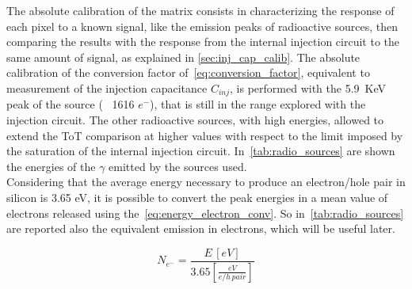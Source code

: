 The absolute calibration of the matrix consists in characterizing the response of each pixel to a known signal, like the emission peaks of radioactive sources, then comparing the results with the response from the internal injection circuit to the same amount of signal, as explained in \autoref{sec:inj_cap_calib}. 
The absolute calibration of the conversion factor of~\autoref{eq:conversion_factor}, equivalent to measurement of the injection capacitance $C_{inj}$,  is performed with the \SI{5.9}{KeV} peak of the  source (~ 1616 $e^{-}$), that is still in the range explored with the injection circuit. The other radioactive sources, with high energies, allowed to extend the ToT comparison at higher values with respect to the limit imposed by the saturation of the internal injection circuit. In~\autoref{tab:radio_sources} are shown the energies of the $\gamma$ emitted by the sources used.\\
Considering that the average energy necessary to produce an electron/hole pair in silicon is 3.65 eV, it is possible to convert the peak energies in a mean value of electrons released using the~\autoref{eq:energy_electron_conv}. So in~\autoref{tab:radio_sources} are reported also the equivalent emission in electrons, which will be useful later.

\begin{equation}
N_{e^{-}} = \frac{E \, [eV]}{3.65 [\frac{eV}{e/h \, pair}]}
\label{eq:energy_electron_conv}
\end{equation}


